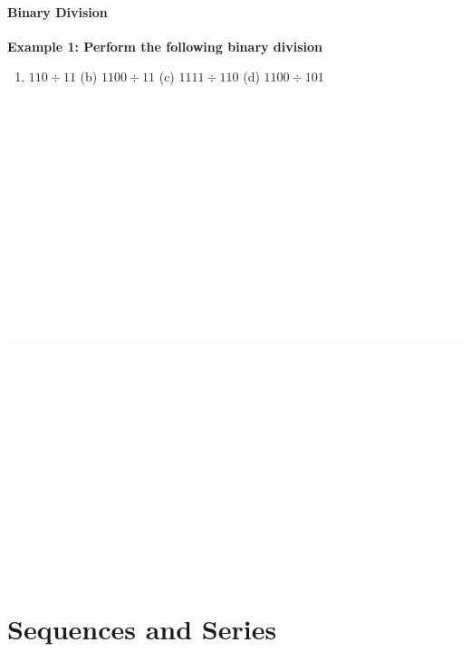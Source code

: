 \documentclass[]{book}
\providecommand{\tightlist}{%
  \setlength{\itemsep}{0pt}\setlength{\parskip}{0pt}}
\begin{document}
\hypertarget{binary-division}{%
\subsubsection{Binary Division}\label{binary-division}}

\textbf{Example 1: Perform the following binary division}

\begin{enumerate}
\def\labelenumi{(\alph{enumi})}
\tightlist
\item
  \(110\div11\) (b) \(1100\div11\) (c) \(1111\div110\) (d) \(1100\div101\)
\end{enumerate}

\begin{center}\includegraphics[width=1\linewidth]{figure/NSbox27-1} \end{center}

\begin{center}\includegraphics[width=1\linewidth]{figure/NSbox28-1} \end{center}

\hypertarget{sequences-and-series}{%
\chapter{Sequences and Series}\label{sequences-and-series}}
\end{document}

